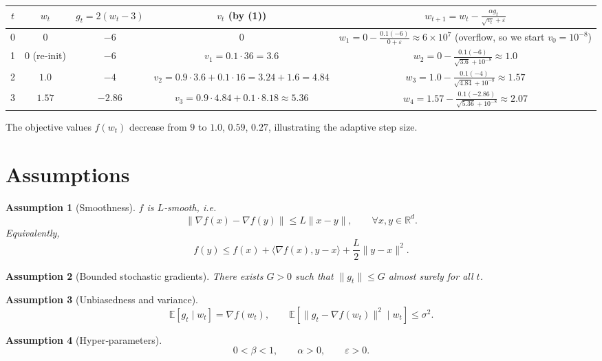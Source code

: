 \documentclass{article}
\newtheorem{assumption}{Assumption}
\newcommand{\E}{\mathbb{E}}
\newcommand{\R}{\mathbb{R}}
\newcommand{\ip}[2]{\langle #1,#2\rangle}
\begin{document}
\begin{center}
\begin{tabular}{c|c|c|c|c}
$t$ & $w_{t}$ & $g_{t}=2(w_{t}-3)$ & $v_{t}$ (by (1)) & $w_{t+1}=w_{t}-\frac{\alpha g_{t}}{\sqrt{v_{t}}+\varepsilon}$\\\hline
0 & $0$ & $-6$ & $0$ & $w_{1}=0-\frac{0.1(-6)}{0+\varepsilon}\approx 6\times10^{7}$ (overflow, so we start $v_{0}=10^{-8}$)\\
1 & $0$ (re‑init) & $-6$ & $v_{1}=0.1\cdot36=3.6$ & $w_{2}=0-\frac{0.1(-6)}{\sqrt{3.6}+10^{-8}}\approx 1.0$\\
2 & $1.0$ & $-4$ & $v_{2}=0.9\cdot3.6+0.1\cdot16=3.24+1.6=4.84$ & $w_{3}=1.0-\frac{0.1(-4)}{\sqrt{4.84}+10^{-8}}\approx 1.57$\\
3 & $1.57$ & $-2.86$ & $v_{3}=0.9\cdot4.84+0.1\cdot8.18\approx 5.36$ & $w_{4}=1.57-\frac{0.1(-2.86)}{\sqrt{5.36}+10^{-8}}\approx 2.07$
\end{tabular}
\end{center}
The objective values $f(w_{t})$ decrease from $9$ to $1.0$, $0.59$, $0.27$, illustrating the adaptive step size.

\newpage
\section*{Assumptions}
\begin{assumption}[Smoothness]\label{as:smooth}
$f$ is $L$‑smooth, i.e.
\[
\|\nabla f(x)-\nabla f(y)\|\le L\|x-y\|,\qquad\forall x,y\in\R^{d}.
\]
Equivalently,
\[
f(y)\le f(x)+\ip{\nabla f(x)}{y-x}+\frac{L}{2}\|y-x\|^{2}.
\tag{3}
\]
\end{assumption}
\begin{assumption}[Bounded stochastic gradients]\label{as:bound}
There exists $G>0$ such that $\|g_{t}\|\le G$ almost surely for all $t$.
\end{assumption}
\begin{assumption}[Unbiasedness and variance]\label{as:stoch}
\[
\E[g_{t}\mid w_{t}]=\nabla f(w_{t}),\qquad
\E\!\left[\|g_{t}-\nabla f(w_{t})\|^{2}\mid w_{t}\right]\le\sigma^{2}.
\]
\end{assumption}
\begin{assumption}[Hyper‑parameters]\label{as:hyper}
\[
0<\beta<1,\qquad \alpha>0,\qquad \varepsilon>0.
\]
\end{assumption}
\end{document}
